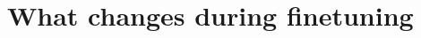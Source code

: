\documentclass{article}
\begin{document}
%
%

\section{What changes during finetuning}
\label{sec:finetuning}
\end{document}
